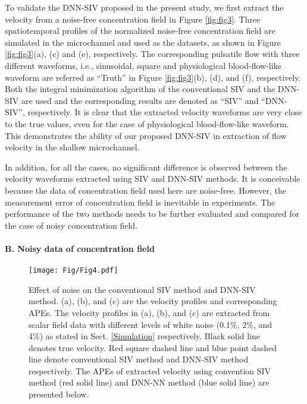 \documentclass{article}
\begin{document}
To validate the DNN-SIV proposed in the present study, we first extract the velocity from a noise-free concentration field in Figure \ref{fig:fig3}. Three spatiotemporal profiles of the normalized noise-free concentration field are simulated in the microchannel and used as the datasets, as shown in Figure \ref{fig:fig3}(a), (c) and (e), respectively. The corresponding pulsatile flow with three different waveforms, i.e., sinusoidal, square and physiological blood-flow-like waveform are referred as ``Truth'' in Figure \ref{fig:fig3}(b), (d), and (f), respectively. Both the integral minimization algorithm of the conventional SIV and the DNN-SIV are used and the corresponding results are denoted as ``SIV'' and ``DNN-SIV'', respectively. It is clear that the extracted velocity waveforms are very close to the true values, even for the case of physiological blood-flow-like waveform. This demonstrates the ability of our proposed DNN-SIV in extraction of flow velocity in the shallow microchannel.\par
In addition, for all the cases, no significant difference is observed between the velocity waveforms extracted using SIV and DNN-SIV methods. It is conceivable because the data of concentration field used here are noise-free. However, the measurement error of concentration field is inevitable in experiments. The performance of the two methods needs to be further evaluated and compared for the case of noisy concentration field.

\paragraph{B. Noisy data of concentration field}\par
\begin{figure}
	\centering
	\texttt{[image: Fig/Fig4.pdf]}
	\caption{Effect of noise on the conventional SIV method and DNN-SIV method. (a), (b), and (c) are the velocity profiles and corresponding APEs. The velocity profiles in (a), (b), and (c) are extracted from scalar field data with different levels of white noise (0.1\%, 2\%, and 4\%) as stated in Sect. \ref{Simulation} respectively. Black solid line denotes true velocity. Red square dashed line and blue point dashed line denote conventional SIV method and DNN-SIV method respectively. The APEs of extracted velocity using convention SIV method (red solid line) and DNN-NN method (blue solid line) are presented below.}
	\label{fig:fig4}
\end{figure}
\end{document}
